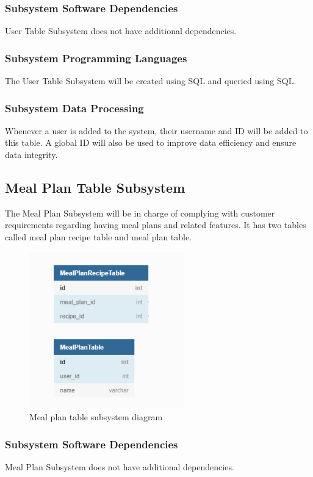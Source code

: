 \subsubsection{Subsystem Software Dependencies}
User Table Subsystem does not have additional dependencies.

\subsubsection{Subsystem Programming Languages}
The User Table Subsystem will be created using SQL and queried using SQL.

\subsubsection{Subsystem Data Processing}
Whenever a user is added to the system, their username and ID will be added to this table. A global ID will also be used to improve data efficiency and ensure data integrity. 

\subsection{Meal Plan Table Subsystem}
The Meal Plan Subsystem will be in charge of complying with customer requirements regarding having meal plans and related features. It has two tables called meal plan recipe table and meal plan table.

\begin{figure}[h!]
	\centering
 	\includegraphics[width=0.60\textwidth]{images/MealPlan_SubSystem.png}
 \caption{Meal plan table subsystem diagram}
\end{figure}

\subsubsection{Subsystem Software Dependencies}
Meal Plan Subsystem does not have additional dependencies.

